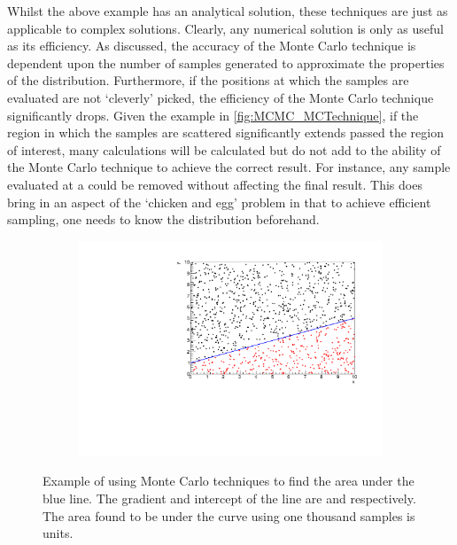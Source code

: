 Whilst the above example has an analytical solution, these techniques are just as applicable to complex solutions. Clearly,  any numerical solution is only as useful as its efficiency. As discussed, the accuracy of the Monte Carlo technique is dependent upon the number of samples generated to approximate the properties of the distribution. Furthermore, if the positions at which the samples are evaluated are not `cleverly' picked, the efficiency of the Monte Carlo technique significantly drops. Given the example in \autoref{fig:MCMC_MCTechnique}, if the region in which the samples are scattered significantly extends passed the region of interest, many calculations will be calculated but do not add to the ability of the Monte Carlo technique to achieve the correct result. For instance, any sample evaluated at a  could be removed without affecting the final result. This does bring in an aspect of the `chicken and egg' problem in that to achieve efficient sampling, one needs to know the distribution beforehand.

\begin{figure}[h]
  \begin{subfigure}[t]{0.80\textwidth}
    \includegraphics[width=\textwidth, trim={0mm 0mm 0mm 0mm}, clip,page=1]{Figures/MCMC/MCTechnique.pdf}
  \end{subfigure}
  \caption{Example of using Monte Carlo techniques to find the area under the blue line. The gradient and intercept of the line are  and  respectively. The area found to be under the curve using one thousand samples is  units.}
  \label{fig:MCMC_MCTechnique}
\end{figure}

